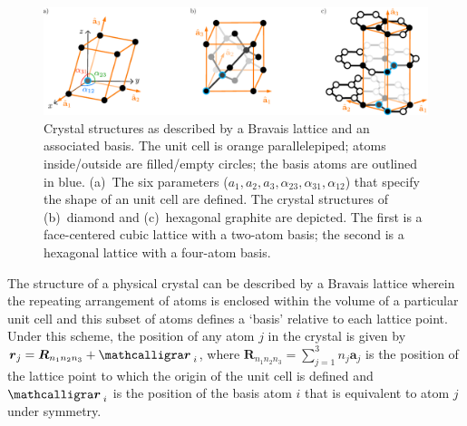 \begin{figure}[t!]
  \centering
  \includegraphics[width = \textwidth]{Figures/fig_ch2_unitcell.pdf}
  \caption[Crystal structures as described by their Bravais lattice.]{
    Crystal structures as described by a Bravais lattice and an associated basis.
    The unit cell is orange parallelepiped; atoms inside/outside are filled/empty circles;
    the basis atoms are outlined in blue.
    (a)~The six parameters ($a_1, a_2, a_3, \alpha_{23}, \alpha_{31}, \alpha_{12}$)
    that specify the shape of an unit cell are defined.
    The crystal structures of (b)~diamond and (c)~hexagonal graphite are depicted.
    The first is a face-centered cubic lattice with a two-atom basis;
    the second is a hexagonal lattice with a four-atom basis.
  }
  \label{fig: unit-cell}
\end{figure}

The structure of a physical crystal can be described
by a Bravais lattice wherein the repeating arrangement of atoms
is enclosed within the volume of a particular unit cell and
this subset of atoms defines a `basis' relative to each lattice point.
Under this scheme, the position of any atom $j$ in the crystal is given by
$\boldsymbol{r}_j = \boldsymbol{R}_{n_1 n_2 n_3} + \boldsymbol{\scriptr}_i$,
where $\boldsymbol{R}_{n_1 n_2 n_3} = \sum \limits_{j = 1}^3 n_j \boldsymbol{a}_j$
is the position of the lattice point to which the origin of the unit cell is defined
and $\boldsymbol{\scriptr}_i$ is the position of the basis atom $i$ that is equivalent
to atom $j$ under symmetry.

